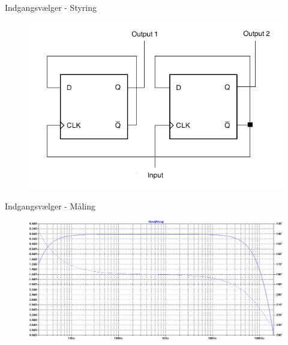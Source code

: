 \begin{frame}{Indgangsvælger - Styring}

\begin{figure}[h]
\centering
\includegraphics[scale=0.4]{../rapport/teknisk/indgangsvaelger/flipflop.png}
\label{fig:indgangsvaelger-flipflop}
\end{figure}
\end{frame}

\begin{frame}{Indgangsvælger - Måling}
\begin{figure}[h]
\centering
\includegraphics[width=\textwidth]{../rapport/teknisk/indgangsvaelger/simulering/frekvenskarakteristik.png}
\label{indgangsvaelger_frekvenskarakteristik}
\end{figure}
\end{frame}

